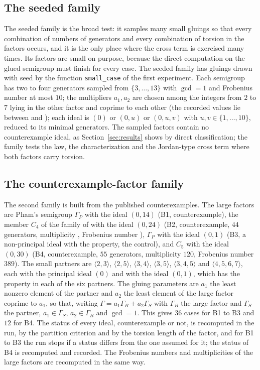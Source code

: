 \documentclass[11pt]{article}
\theoremstyle{definition}
\theoremstyle{remark}
\begin{document}
\subsection{The seeded family}

The seeded family is the broad test: it samples many small gluings so that every combination of numbers of generators and every combination of torsion in the factors
occurs, and it is the only place where the cross term is exercised many times. Its factors are small on purpose, because the direct computation on the glued semigroup must finish for every case.
The seeded family has \NSeeded{} gluings drawn with seed \Seed{} by the function \texttt{small\_case} of the first experiment. Each semigroup has
two to four generators sampled from $\{3,\dots,13\}$ with $\gcd=1$ and Frobenius number at most $10$; the multipliers $a_1,a_2$ are
chosen among the integers from $2$ to $7$ lying in the other factor and coprime to each other (the recorded values lie between
\SeededAMin{} and \SeededAMax{}); each ideal is $(0)$ or $(0,u)$ or $(0,u,v)$ with $u,v\in\{1,\dots,10\}$, reduced to its minimal generators.
The sampled factors contain no counterexample ideal, as Section~\ref{sec:results} shows by direct classification; the family tests the law, the
characterization and the Jordan-type cross term where both factors carry torsion.

\subsection{The counterexample-factor family}

The second family is built from the published counterexamples. The large factors are Pham's semigroup $\Gamma_P$ with the ideal $(0,14)$
(B1, counterexample), the member $C_4$ of the family of \cite{SantibanezLeal2026} with the ideal $(0,24)$ (B2, counterexample, $44$ generators,
multiplicity \MultCfour, Frobenius number \FrobCfour), $\Gamma_P$ with the ideal $(0,1)$ (B3, a non-principal ideal with the property, the
control), and $C_5$ with the ideal $(0,30)$ (B4, counterexample, $55$ generators, multiplicity $120$, Frobenius number $389$). The small partners are
$\langle2,3\rangle$, $\langle2,5\rangle$, $\langle3,4\rangle$, $\langle3,5\rangle$, $\langle3,4,5\rangle$ and $\langle4,5,6,7\rangle$, each with the principal ideal $(0)$ and
with the ideal $(0,1)$, which has the property in each of the six partners. The gluing parameters are $a_1$ the least nonzero element of the
partner and $a_2$ the least element of the large factor coprime to $a_1$, so that, writing $\Gamma=a_1\Gamma_B+a_2\Gamma_S$ with $\Gamma_B$ the large factor and $\Gamma_S$ the partner, $a_1\in\Gamma_S$, $a_2\in\Gamma_B$ and $\gcd=1$. This gives $36$ cases for B1 to B3 and $12$
for B4. The status of every ideal, counterexample or not, is recomputed in the run, by the partition criterion and by the torsion length of the factor, and for B1 to B3 the run stops if a status differs from the one assumed for it; the status of B4 is recomputed and recorded. The Frobenius numbers and multiplicities of the large factors are recomputed in the same way.
\end{document}
